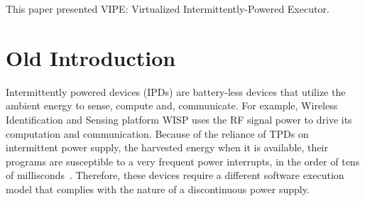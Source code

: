 \documentclass[sigconf,anonymous,review]{acmart}
\newcommand{\sys}{VIPE\xspace}
\newcommand{\sysfull}{Virtualized Intermittently-Powered Executor\xspace}
\begin{document}
This paper presented \sys: \sysfull.


\newpage

\section{Old Introduction}
	Intermittently powered devices (IPDs) are battery-less devices that utilize the ambient energy to sense, compute and, communicate. For example, Wireless Identification and Sensing platform WISP \cite{wisp} uses the RF signal power to drive its computation and communication. Because of the reliance of TPDs on intermittent power supply, the harvested energy when it is available, their programs are susceptible to a very frequent power interrupts, in the order of tens of millisconds~\cite{}. Therefore, these devices require a different software execution model that complies with the nature of a discontinuous power supply. 
\end{document}
